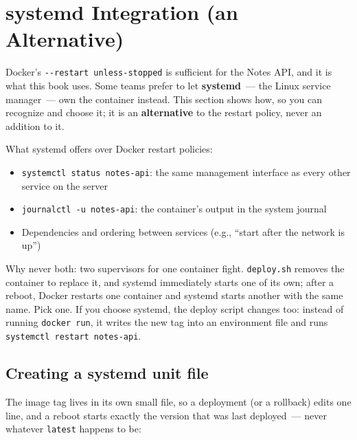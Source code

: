 \setcounter{section}{6}
\section{systemd Integration (an Alternative)}\label{24-process-startup:247-systemd-integration-an-alternative}

Docker's \texttt{-}\allowbreak{}\texttt{-}\allowbreak{}\texttt{restart\ unless-}\allowbreak{}\texttt{stopped} is sufficient for the Notes API, and it is what this book uses. Some teams prefer to let \textbf{systemd}~--- the Linux service manager~--- own the container instead. This section shows how, so you can recognize and choose it; it is an \textbf{alternative} to the restart policy, never an addition to it.

What systemd offers over Docker restart policies:

\begin{itemize}
\tightlist
\item
  \texttt{systemctl\ status\ notes-}\allowbreak{}\texttt{api}: the same management interface as every other service on the server
\item
  \texttt{journalctl\ -u\ notes-api}: the container's output in the system journal
\item
  Dependencies and ordering between services (e.g., ``start after the network is up'')
\end{itemize}

\noindent{}Why never both: two supervisors for one container fight. \texttt{deploy.sh} removes the container to replace it, and systemd immediately starts one of its own; after a reboot, Docker restarts one container and systemd starts another with the same name. Pick one. If you choose systemd, the deploy script changes too: instead of running \texttt{docker\ run}, it writes the new tag into an environment file and runs \texttt{systemctl\ restart\ notes-}\allowbreak{}\texttt{api}.

\subsection*{Creating a systemd unit file}\label{24-process-startup:creating-a-systemd-unit-file}

The image tag lives in its own small file, so a deployment (or a rollback) edits one line, and a reboot starts exactly the version that was last deployed~--- never whatever \texttt{latest} happens to be:

\begin{codebox}[short]

\begin{Shaded}
\begin{Highlighting}[]
\OperatorTok{=}
\end{Highlighting}
\end{Shaded}

\end{codebox}


